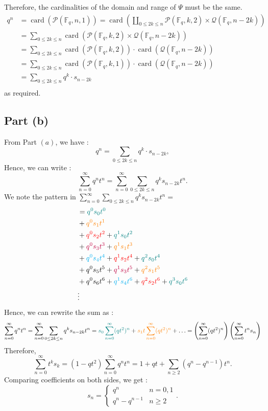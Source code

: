 Therefore, the cardinalities of the domain and range of $\Psi$ must be the same.
\begin{align*}
    q^n &=\operatorname{card}(\mathcal{P}(\mathbb{F}_q, n,1)) = \operatorname{card}\left(\coprod_{0\leq 2k\leq n} \mathcal{P}(\mathbb{F}_q, k,2)\times \mathcal{Q}(\mathbb{F}_q, n-2k)\right) \\
    &= \sum_{0\leq 2k\leq n} \operatorname{card}(\mathcal{P}(\mathbb{F}_q, k,2)\times \mathcal{Q}(\mathbb{F}_q, n-2k)) \\
    &= \sum_{0\leq 2k\leq n} \operatorname{card}(\mathcal{P}(\mathbb{F}_q, k,2))\cdot\operatorname{card}(\mathcal{Q}(\mathbb{F}_q, n-2k)) \\
    &= \sum_{0\leq 2k\leq n} \operatorname{card}(\mathcal{P}(\mathbb{F}_q, k,1))\cdot\operatorname{card}(\mathcal{Q}(\mathbb{F}_q, n-2k)) \\
    &= \sum_{0\leq 2k\leq n} q^k \cdot s_{n-2k}\\
\end{align*}
as required.
\subsection{Part (b)}
From Part $(a)$, we have : 
\[q^n = \sum_{0\leq 2k\leq n} q^k \cdot s_{n-2k},\]
Hence, we can write : 
\[\sum_{n=0}^{\infty} q^n t^n = \sum_{n=0}^{\infty} \sum_{0\leq 2k\leq n} q^k s_{n-2k}t^n.\]
We note the pattern in $\sum_{n=0}^{\infty} \sum_{0\leq 2k\leq n} q^k s_{n-2k}t^n = $ 
\begin{align*}
     &= \mathcolor{teal}{q^0 s_0 t^0} \\
    &+ \mathcolor{orange}{q^0 s_1 t^1} \\
    &+ \mathcolor{red}{q^0 s_2 t^2} + \mathcolor{teal}{q^1 s_0 t^2} \\
    &+ \mathcolor{purple}{q^0 s_3 t^3} + \mathcolor{orange}{q^1 s_1 t^3}  \\
    &+ \mathcolor{cyan}{q^0 s_4 t^4} + \mathcolor{red}{q^1 s_2 t^4} + \mathcolor{teal}{q^2 s_0 t^4} \\ 
    &+ q^0 s_5 t^5 + \mathcolor{purple}{q^1 s_3 t^5} + \mathcolor{orange}{q^2 s_1 t^5} \\
    &+ q^0 s_6 t^6 + \mathcolor{cyan}{q^1 s_4 t^6} + \mathcolor{red}{q^2 s_2 t^6} + \mathcolor{teal}{q^3 s_0 t^6} \\
    &\vdots
\end{align*}
Hence, we can rewrite the sum as : 
\begin{align*}
    \sum_{n=0}^{\infty} q^n t^n = \sum_{n=0}^{\infty} \sum_{0\leq 2k\leq n} q^k s_{n-2k}t^n = 
    \mathcolor{teal}{s_0 \sum_{n=0}^{\infty}(qt^2)^n} + \mathcolor{orange}{s_1 t \sum_{n=0}^{\infty}(qt^2)^n} + \ldots = \left(\sum_{n=0}^{\infty}(qt^2)^n\right)\left(\sum_{n=0}^{\infty}t^n s_n\right)
\end{align*}
Therefore, 
\[\sum_{n=0}^{\infty}t^k s_k = (1-qt^2)\sum_{n=0}^{\infty} q^n t^n = 1 + qt + \sum_{n\geq 2} (q^n - q^{n-1})t^n.\]
Comparing coefficients on both sides, we get : 
\[s_n = \begin{cases} q^n & n=0,1 \\ q^n - q^{n-1} & n\geq 2\end{cases}\tag{$n\geq 2$}.\]


